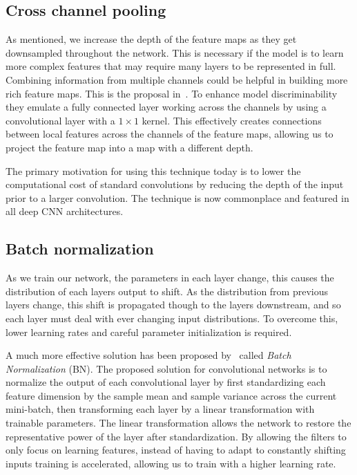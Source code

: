 \subsection{Cross channel pooling}

As mentioned, we increase the depth of the feature maps as they get downsampled throughout the network.
This is necessary if the model is to learn more complex features that may require many layers to be represented in full.
Combining information from multiple channels could be helpful in building more rich feature maps.
This is the proposal in~\cite{lin2014network}.
To enhance model discriminability they emulate a fully connected layer working across the channels by using a convolutional layer with a \(1\times 1\) kernel.
This effectively creates connections between local features across the channels of the feature maps, allowing us to project the feature map into a map with a different depth.

The primary motivation for using this technique today is to lower the computational cost of standard convolutions by reducing the depth of the input prior to a larger convolution.
The technique is now commonplace and featured in all deep CNN architectures.

\subsection{Batch normalization}
As we train our network, the parameters in each layer change, this causes the distribution of each layers output to shift.
As the distribution from previous layers change, this shift is propagated though to the layers downstream, and so each layer must deal with ever changing input distributions.
To overcome this, lower learning rates and careful parameter initialization is required. 

A much more effective solution has been proposed by~\cite{ioffe2015batch} called \textit{Batch Normalization} (BN).
The proposed solution for convolutional networks is to normalize the output of each convolutional layer by first standardizing each feature dimension by the sample mean and sample variance across the current mini-batch, then transforming each layer by a linear transformation with trainable parameters.
The linear transformation allows the network to restore the representative power of the layer after standardization.
By allowing the filters to only focus on learning features, instead of having to adapt to constantly shifting inputs training is accelerated, allowing us to train with a higher learning rate.

